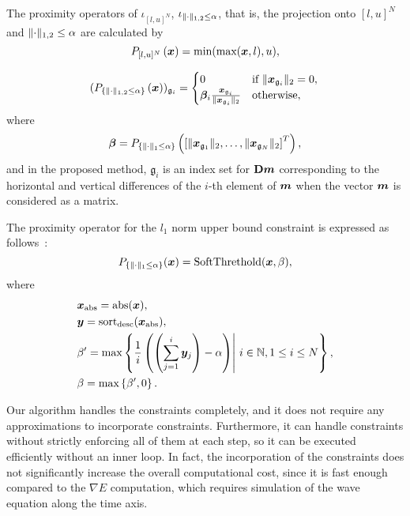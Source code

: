 The proximity operators of $\iota_{[l,u]^N}$, $\iota_{\LOneTwoNorm{\cdot} \le \alpha}$, that is, the projection onto $[l,u]^N$ and ${\LOneTwoNorm{\cdot} \le \alpha}$ are calculated by
\begin{equation} \label{eq:ProximityOperatorForBoxConstraint} \projBoxSolution, \end{equation}

\begin{equation} \label{eq:ProximityOperatorForL12Ball} \projLOneTwoBallSolution \end{equation}
where
\begin{equation} \label{eq:ProximityOperatorForL12BallWhere} \projLOneTwoBallSolutionWhere, \notag \end{equation}
and in the proposed method, $\mathfrak{g}_i$ is an index set for $\diffOperator \velModel$ corresponding to the horizontal and vertical differences of the $i$-th element of $\velModel$ when the vector $\velModel$ is considered as a matrix.

The proximity operator for the $l_1$ norm upper bound constraint is expressed as follows~\cite{L1-ball-projection}:
\begin{equation} \label{eq:ProximityOperatorForL1Ball}  \projLOneBallSolution, \end{equation}
where
\begin{equation} \label{eq:ProximityOperatorForL1BallWhere} \projLOneBallSolutionWhere \notag \end{equation}

Our algorithm handles the constraints completely, and it does not require any approximations to incorporate constraints.
Furthermore, it can handle constraints without strictly enforcing all of them at each step, so it can be executed efficiently without an inner loop.
In fact, the incorporation of the constraints does not significantly increase the overall computational cost, since it is fast enough compared to the $\nabla E$ computation, which requires simulation of the wave equation along the time axis.
